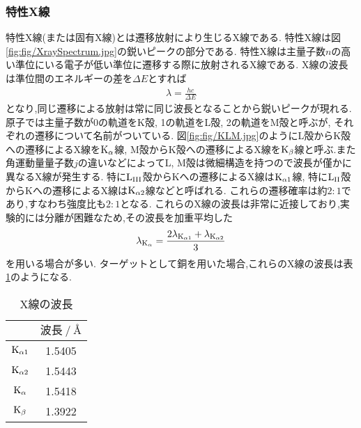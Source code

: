 \subsubsection{特性X線}
特性X線(または固有X線)とは遷移放射により生じるX線である.
特性X線は図\ref{fig:fig/XraySpectrum.jpg}の鋭いピークの部分である.
特性X線は主量子数$n$の高い準位にいる電子が低い準位に遷移する際に放射されるX線である.
X線の波長は準位間のエネルギーの差を$\Delta E$とすれば
\begin{align}
  \lambda=\frac{hc}{\Delta E}
\end{align}
となり,同じ遷移による放射は常に同じ波長となることから鋭いピークが現れる.
原子では主量子数が0の軌道をK殻, 1の軌道をL殻, 2の軌道をM殻と呼ぶが,
それぞれの遷移について名前がついている.
図\ref{fig:fig/KLM.jpg}のようにL殻からK殻への遷移によるX線を$\rm K_{\alpha}$線,
M殻からK殻への遷移によるX線を$\rm K_{\beta}$線と呼ぶ.また角運動量量子数$j$の違いなどによってL, M殻は微細構造を持つので波長が僅かに異なるX線が発生する.
特に$\rm L_{III}$殻からKへの遷移によるX線は$\rm K_{\alpha 1}$線, 特に$\rm L_{II}$殻からKへの遷移によるX線は$\rm K_{\alpha 2}$線などと呼ばれる.
これらの遷移確率は約$2:1$であり,すなわち強度比も$2:1$となる.
これらのX線の波長は非常に近接しており,実験的には分離が困難なため,その波長を加重平均した
\begin{align}
  \lambda_{\rm K_{\alpha}}=\frac{2\lambda_{{\rm K}_{\alpha 1}}+\lambda_{{\rm K}_{\alpha 2}}}{3}
\end{align}
を用いる場合が多い.\cite{XrayS}
ターゲットとして銅を用いた場合,これらのX線の波長は表\ref{tab:lambda_xray}のようになる.
\begin{table}[h]
\caption{X線の波長}
\label{tab:lambda_xray}
\centering
\begin{tabular}{cc}
\hline
&$波長\ /\ \si{\angstrom}$\\
\hline \hline
${\rm K}_{\alpha 1}$&1.5405\\
${\rm K}_{\alpha 2}$&1.5443\\
${\rm K}_{\alpha}$&1.5418\\
${\rm K}_{\beta}$&1.3922\\
\hline
\end{tabular}
\end{table}
